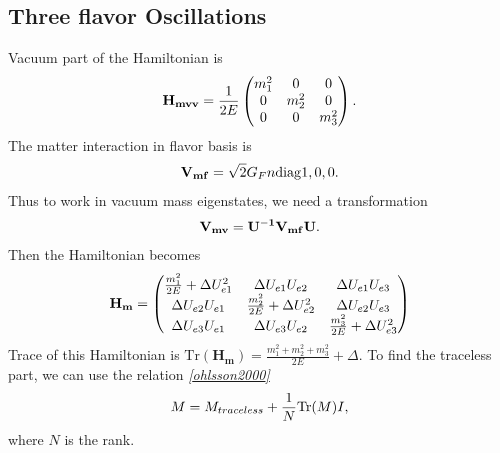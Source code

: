 \documentclass[letterpaper,12pt,english]{sphinxmanual}
\begin{document}
\subsection{Three flavor Oscillations}
\label{msw:three-flavor-oscillations}
Vacuum part of the Hamiltonian is
\begin{gather}
\begin{split}\mathbf{H_{mvv}} = \frac{1}{2E} \begin{pmatrix}
m_1^2 & 0 & 0 \\
0 & m_2^2 & 0 \\
0 & 0 & m_3^2
\end{pmatrix}.\end{split}\notag
\end{gather}
The matter interaction in flavor basis is
\begin{gather}
\begin{split}\mathbf{V_{mf}} = \sqrt{2}G_F n \mathrm{diag}{1,0,0}.\end{split}\notag
\end{gather}
Thus to work in vacuum mass eigenstates, we need a transformation
\begin{gather}
\begin{split}\mathbf{V_{mv}} = \mathbf{U^{-1}}\mathbf{V_{mf}} \mathbf{U}.\end{split}\notag
\end{gather}
Then the Hamiltonian becomes
\begin{gather}
\begin{split}\mathbf{H_{m}} = \begin{pmatrix}
\frac{m_1^2}{2E} + \Delta U_{e1}^2 & \Delta U_{e1} U_{e2} & \Delta U_{e1} U_{e3} \\
\Delta U_{e2} U_{e1} & \frac{m_2^2}{2E} + \Delta U_{e2}^2 & \Delta U_{e2} U_{e3} \\
\Delta U_{e3} U_{e1} & \Delta U_{e3} U_{e2} & \frac{m_3^2}{2E} + \Delta U_{e3}^2
\end{pmatrix}\end{split}\notag
\end{gather}
Trace of this Hamiltonian is \(\mathrm{Tr}(\mathbf{H_m}) = \frac{m_1^2+m_2^2+m_3^2}{2E}+\Delta\). To find the traceless part, we can use the relation \label{msw:id5}{\hyperref[msw:ohlsson2000]{\emph{{[}ohlsson2000{]}}}}
\begin{gather}
\begin{split}M = M_{traceless}+ \frac{1}{N} \mathrm{Tr}(M) I,\end{split}\notag
\end{gather}
where \(N\) is the rank.
\end{document}

